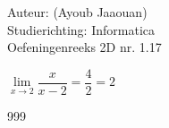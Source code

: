 \documentclass[a4paper]{article}
\begin{document}
\noindent \large Auteur: (Ayoub Jaaouan) \\
\noindent \large Studierichting: Informatica\\
\noindent \large Oefeningenreeks 2D nr. 1.17\\

\medskip

\normalsize

$\lim\limits_{x \rightarrow 2} \dfrac{x}{x-2} = \dfrac{4}{2} = 2$\\

\begin{thebibliography}{999}
\end{thebibliography}
\end{document}
